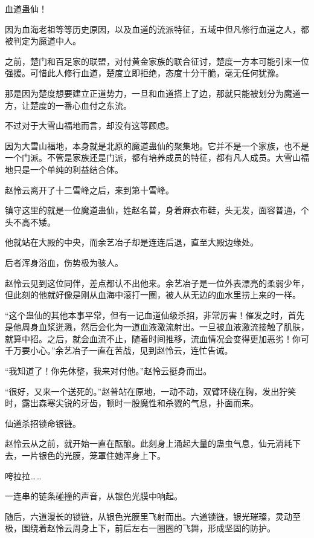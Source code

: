 
\begin{this_body}



血道蛊仙！

因为血海老祖等等历史原因，以及血道的流派特征，五域中但凡修行血道之人，都被判定为魔道中人。

之前，楚门和百足家的联盟，对付黄金家族的联合征讨，楚度一方本可能引来一位强援。可惜此人修行血道，楚度立即拒绝，态度十分干脆，毫无任何犹豫。

那是因为楚度想要建立正道势力，一旦和血道搭上了边，那就只能被划分为魔道一方，让楚度的一番心血付之东流。

不过对于大雪山福地而言，却没有这等顾虑。

因为大雪山福地，本身就是北原的魔道蛊仙的聚集地。它并不是一个家族，也不是一个门派。不管是家族还是门派，都有培养成员的特征，都有凡人成员。大雪山福地只是一个单纯的利益结合体。

赵怜云离开了十二雪峰之后，来到第十雪峰。

镇守这里的就是一位魔道蛊仙，姓赵名普，身着麻衣布鞋，头无发，面容普通，个头不高不矮。

他就站在大殿的中央，而余艺冶子却是连连后退，直至大殿边缘处。

后者浑身浴血，伤势极为骇人。

赵怜云见到这位同伴，差点都认不出他来。余艺冶子是一位外表漂亮的柔弱少年，但此刻的他就好像是刚从血海中滚打一圈，被人从无边的血水里捞上来的一样。

“这个蛊仙的其他本事平常，但有一记血道仙级杀招，非常厉害！催发之时，首先是他周身血浆迸溅，然后会化为一道血液激流射出。一旦被血液激流接触了肌肤，就算中招。之后，就会血流不止，随着时间推移，流血情况会变得更加恶劣！你可千万要小心。”余艺冶子一直在苦战，见到赵怜云，连忙告诫。

“我知道了！你先休整，我来对付他。”赵怜云挺身而出。

“很好，又来一个送死的。”赵普站在原地，一动不动，双臂环绕在胸，发出狞笑时，露出森寒尖锐的牙齿，顿时一股魔性和杀戮的气息，扑面而来。

仙道杀招锁命银链。

赵怜云从之前，就开始一直在酝酿。此刻身上涌起大量的蛊虫气息，仙元消耗下去，一片银色的光膜，笼罩住她浑身上下。

咵拉拉……

一连串的链条碰撞的声音，从银色光膜中响起。

随后，六道漫长的锁链，从银色光膜里飞射而出。六道锁链，银光璀璨，灵动至极，围绕着赵怜云周身上下，前后左右一圈圈的飞舞，形成坚固的防护。


\end{this_body}
